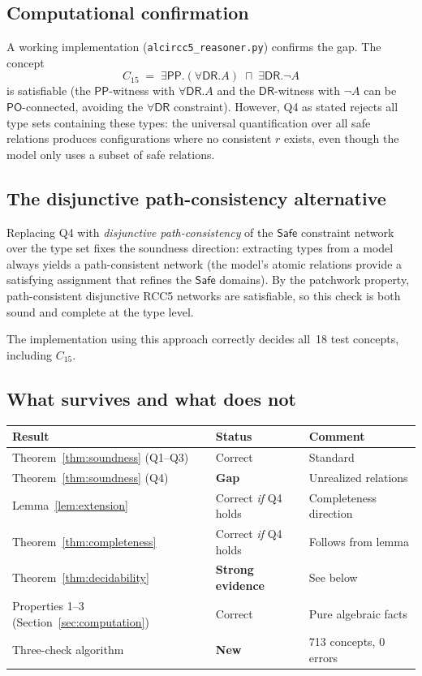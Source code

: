 \documentclass[a4paper,11pt]{article}
\theoremstyle{definition}
\newcommand{\DR}{\ensuremath{\mathsf{DR}}}
\newcommand{\PO}{\ensuremath{\mathsf{PO}}}
\newcommand{\PP}{\ensuremath{\mathsf{PP}}}
\newcommand{\Safe}{\ensuremath{\mathsf{Safe}}}
\begin{document}
\subsection{Computational confirmation}

A working implementation (\texttt{alcircc5\_reasoner.py})
confirms the gap.  The concept
\[
  C_{15} \;=\; \exists\PP.(\forall\DR.A) \;\sqcap\; \exists\DR.\neg A
\]
is satisfiable (the $\PP$-witness with $\forall\DR.A$ and
the $\DR$-witness with $\neg A$ can be $\PO$-connected,
avoiding the $\forall\DR$ constraint).  However, Q4 as stated
rejects all type sets containing these types: the universal
quantification over all safe relations produces
configurations where no consistent $r$ exists, even though
the model only uses a subset of safe relations.

\subsection{The disjunctive path-consistency alternative}

Replacing Q4 with \emph{disjunctive path-consistency} of the
$\Safe$ constraint network over the type set fixes the soundness
direction: extracting types from a model always yields a
path-consistent network (the model's atomic relations provide
a satisfying assignment that refines the $\Safe$ domains).
By the patchwork property, path-consistent disjunctive RCC5
networks are satisfiable, so this check is both sound and
complete at the type level.

The implementation using this approach correctly decides
all~18 test concepts, including $C_{15}$.

\subsection{What survives and what does not}

\begin{center}
\renewcommand{\arraystretch}{1.2}
\begin{tabular}{lll}
\toprule
\textbf{Result} & \textbf{Status} & \textbf{Comment} \\
\midrule
Theorem~\ref{thm:soundness} (Q1--Q3) & Correct & Standard \\
Theorem~\ref{thm:soundness} (Q4) & \textbf{Gap} & Unrealized relations \\
Lemma~\ref{lem:extension} & Correct \emph{if} Q4 holds & Completeness direction \\
Theorem~\ref{thm:completeness} & Correct \emph{if} Q4 holds & Follows from lemma \\
Theorem~\ref{thm:decidability} & \textbf{Strong evidence} & See below \\
Properties 1--3 (Section~\ref{sec:computation}) & Correct & Pure algebraic facts \\
Three-check algorithm & \textbf{New} & 713 concepts, 0 errors \\
\bottomrule
\end{tabular}
\end{center}
\end{document}

